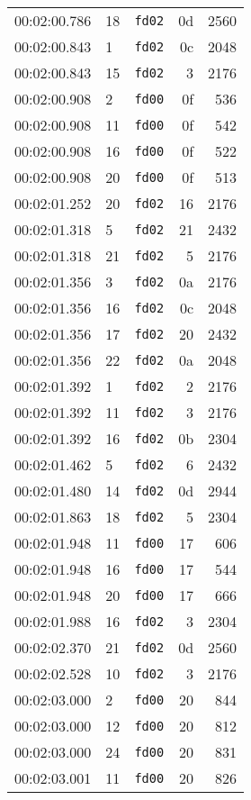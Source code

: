 \documentclass{article}
\begin{document}
\begin{longtable}{lllrr}
00:02:00.786 & 18 & \texttt{fd02} & 0d & 2560 \\
00:02:00.843 & 1 & \texttt{fd02} & 0c & 2048 \\
00:02:00.843 & 15 & \texttt{fd02} & 3 & 2176 \\
00:02:00.908 & 2 & \texttt{fd00} & 0f & 536 \\
00:02:00.908 & 11 & \texttt{fd00} & 0f & 542 \\
00:02:00.908 & 16 & \texttt{fd00} & 0f & 522 \\
00:02:00.908 & 20 & \texttt{fd00} & 0f & 513 \\
00:02:01.252 & 20 & \texttt{fd02} & 16 & 2176 \\
00:02:01.318 & 5 & \texttt{fd02} & 21 & 2432 \\
00:02:01.318 & 21 & \texttt{fd02} & 5 & 2176 \\
00:02:01.356 & 3 & \texttt{fd02} & 0a & 2176 \\
00:02:01.356 & 16 & \texttt{fd02} & 0c & 2048 \\
00:02:01.356 & 17 & \texttt{fd02} & 20 & 2432 \\
00:02:01.356 & 22 & \texttt{fd02} & 0a & 2048 \\
00:02:01.392 & 1 & \texttt{fd02} & 2 & 2176 \\
00:02:01.392 & 11 & \texttt{fd02} & 3 & 2176 \\
00:02:01.392 & 16 & \texttt{fd02} & 0b & 2304 \\
00:02:01.462 & 5 & \texttt{fd02} & 6 & 2432 \\
00:02:01.480 & 14 & \texttt{fd02} & 0d & 2944 \\
00:02:01.863 & 18 & \texttt{fd02} & 5 & 2304 \\
00:02:01.948 & 11 & \texttt{fd00} & 17 & 606 \\
00:02:01.948 & 16 & \texttt{fd00} & 17 & 544 \\
00:02:01.948 & 20 & \texttt{fd00} & 17 & 666 \\
00:02:01.988 & 16 & \texttt{fd02} & 3 & 2304 \\
00:02:02.370 & 21 & \texttt{fd02} & 0d & 2560 \\
00:02:02.528 & 10 & \texttt{fd02} & 3 & 2176 \\
00:02:03.000 & 2 & \texttt{fd00} & 20 & 844 \\
00:02:03.000 & 12 & \texttt{fd00} & 20 & 812 \\
00:02:03.000 & 24 & \texttt{fd00} & 20 & 831 \\
00:02:03.001 & 11 & \texttt{fd00} & 20 & 826 \\

\end{longtable}
\end{document}
